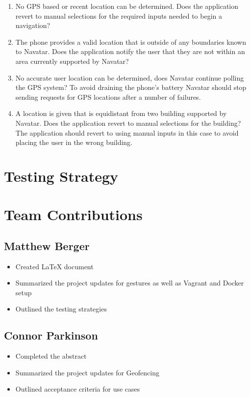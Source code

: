 \documentclass{scrreprt}
\begin{document}
\begin{enumerate}
	\item No GPS based or recent location can be determined. Does the application revert to manual selections for the required inputs needed to begin a navigation?
	
	\item The phone provides a valid location that is outside of any boundaries known to Navatar. Does the application notify the user that they are not within an area currently supported by Navatar?
	
	\item No accurate user location can be determined, does Navatar continue polling the GPS system? To avoid draining the phone’s battery Navatar should stop sending requests for GPS locations after a number of failures.
	
	\item A location is given that is equidistant from two building supported by Navatar. Does the application revert to manual selections for the building? The application should revert to using manual inputs in this case to avoid placing the user in the wrong building.

\end{enumerate}

\chapter{Testing Strategy}

\chapter{Team Contributions}
	\section{Matthew Berger}
		\begin{itemize}
			\item Created LaTeX document
			\item Summarized the project updates for gestures as well as Vagrant and Docker setup
			\item Outlined the testing strategies
		\end{itemize}
	\section{Connor Parkinson}
		\begin{itemize}
			\item Completed the abstract
			\item Summarized the project updates for Geofencing
			\item Outlined acceptance criteria for use cases
		\end{itemize}
\end{document}
